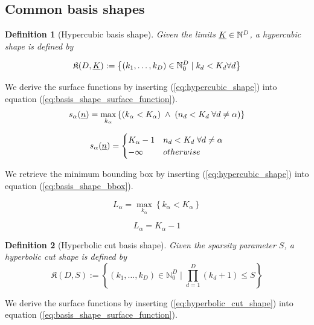 \documentclass{article}
\newtheorem{definition}{Definition}
\begin{document}
\subsection{Common basis shapes}
\begin{definition}[Hypercubic basis shape]
  Given the limits \(\underline{K} \in \mathbb{N}^D\), a hypercubic shape is defined by

  \begin{equation}
    \label{eq:hypercubic_shape}
    \mathfrak{K}(D,\underline{K}):=\left\{(k_1,\dots,k_D) \in \mathbb{N}_0^D \;|\; k_d < K_d \forall d\right\}
  \end{equation}
\end{definition}

We derive the surface functions by inserting (\ref{eq:hypercubic_shape}) into
equation
(\ref{eq:basis_shape_surface_function}).
\[
  s_{\alpha}(\underline{n})=\max_{k_{\alpha}}\left\{(k_{\alpha}<K_{\alpha}) \;\land\;
    (n_d < K_d \;\forall d \neq \alpha)\right\}
\]

\begin{equation}
  s_{\alpha}(\underline{n})=
  \begin{cases}
    K_{\alpha}-1 & n_d < K_d \;\forall d \neq \alpha \\
    -\infty & otherwise \\
  \end{cases}
\end{equation}

We retrieve the minimum bounding box by inserting (\ref{eq:hypercubic_shape}) into
equation
(\ref{eq:basis_shape_bbox}).

\[
L_{\alpha}=\max_{k_{\alpha}}\left\{k_{\alpha}<K_{\alpha}\right\}
\]

\begin{equation}
L_{\alpha}=K_{\alpha}-1
\end{equation}

\begin{definition}[Hyperbolic cut basis shape]
  Given the sparsity parameter \(S\), a hyperbolic cut shape is defined by
  \begin{equation}
    \mathfrak{K}(D,S):=\left\{(k_1,\dots,k_D) \in \mathbb{N}_0^D \;|\;\prod_{d=1}^D(k_d+1) \leq S\right\}
    \label{eq:hyperbolic_cut_shape}
  \end{equation}
\end{definition}

We derive the surface functions by inserting (\ref{eq:hyperbolic_cut_shape}) into
equation (\ref{eq:basis_shape_surface_function}).
\end{document}
